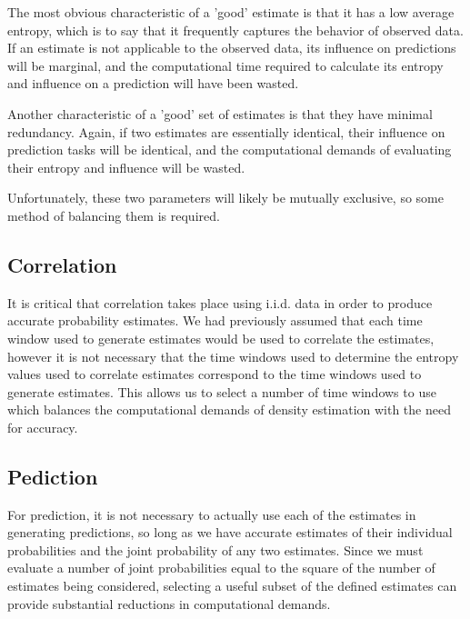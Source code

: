 \documentclass[10pt]{article}
\begin{document}
The most obvious characteristic of a 'good' estimate is that it has a low average entropy, which is to say that it frequently captures the behavior of observed data.  If an estimate is not applicable to the observed data, its influence on predictions will be marginal, and the computational time required to calculate its entropy and influence on a prediction will have been wasted.  

Another characteristic of a 'good' set of estimates is that they have minimal redundancy.  Again, if two estimates are essentially identical, their influence on prediction tasks will be identical, and the computational demands of evaluating their entropy and influence will be wasted. 

Unfortunately, these two parameters will likely be mutually exclusive, so some method of balancing them is required.

\subsection{Correlation}
It is critical that correlation takes place using i.i.d. data in order to produce accurate probability estimates.  We had previously assumed that each time window used to generate estimates would be used to correlate the estimates, however it is not necessary that the time windows used to determine the entropy values used to correlate estimates correspond to the time windows used to generate estimates.  This allows us to select a number of time windows to use which balances the computational demands of density estimation with the need for accuracy.

\subsection{Pediction}
For prediction, it is not necessary to actually use each of the estimates in generating predictions, so long as we have accurate estimates of their individual probabilities and the joint probability of any two estimates.  Since we must evaluate a number of joint probabilities equal to the square of the number of estimates being considered, selecting a useful subset of the defined estimates can provide substantial reductions in computational demands.

\end{document}
